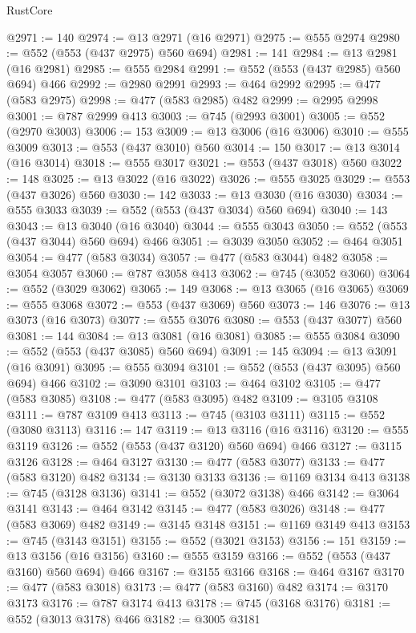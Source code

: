 \begin{lexlean}{RustCore}
\begin{coremodule}
@2971 := 140
@2974 := @13 @2971 (@16 @2971)
@2975 := @555 @2974
@2980 := @552 (@553 (@437 @2975) @560 @694)
@2981 := 141
@2984 := @13 @2981 (@16 @2981)
@2985 := @555 @2984
@2991 := @552 (@553 (@437 @2985) @560 @694) @466
@2992 := @2980 @2991
@2993 := @464 @2992
@2995 := @477 (@583 @2975)
@2998 := @477 (@583 @2985) @482
@2999 := @2995 @2998
@3001 := @787 @2999 @413
@3003 := @745 (@2993 @3001)
@3005 := @552 (@2970 @3003)
@3006 := 153
@3009 := @13 @3006 (@16 @3006)
@3010 := @555 @3009
@3013 := @553 (@437 @3010) @560
@3014 := 150
@3017 := @13 @3014 (@16 @3014)
@3018 := @555 @3017
@3021 := @553 (@437 @3018) @560
@3022 := 148
@3025 := @13 @3022 (@16 @3022)
@3026 := @555 @3025
@3029 := @553 (@437 @3026) @560
@3030 := 142
@3033 := @13 @3030 (@16 @3030)
@3034 := @555 @3033
@3039 := @552 (@553 (@437 @3034) @560 @694)
@3040 := 143
@3043 := @13 @3040 (@16 @3040)
@3044 := @555 @3043
@3050 := @552 (@553 (@437 @3044) @560 @694) @466
@3051 := @3039 @3050
@3052 := @464 @3051
@3054 := @477 (@583 @3034)
@3057 := @477 (@583 @3044) @482
@3058 := @3054 @3057
@3060 := @787 @3058 @413
@3062 := @745 (@3052 @3060)
@3064 := @552 (@3029 @3062)
@3065 := 149
@3068 := @13 @3065 (@16 @3065)
@3069 := @555 @3068
@3072 := @553 (@437 @3069) @560
@3073 := 146
@3076 := @13 @3073 (@16 @3073)
@3077 := @555 @3076
@3080 := @553 (@437 @3077) @560
@3081 := 144
@3084 := @13 @3081 (@16 @3081)
@3085 := @555 @3084
@3090 := @552 (@553 (@437 @3085) @560 @694)
@3091 := 145
@3094 := @13 @3091 (@16 @3091)
@3095 := @555 @3094
@3101 := @552 (@553 (@437 @3095) @560 @694) @466
@3102 := @3090 @3101
@3103 := @464 @3102
@3105 := @477 (@583 @3085)
@3108 := @477 (@583 @3095) @482
@3109 := @3105 @3108
@3111 := @787 @3109 @413
@3113 := @745 (@3103 @3111)
@3115 := @552 (@3080 @3113)
@3116 := 147
@3119 := @13 @3116 (@16 @3116)
@3120 := @555 @3119
@3126 := @552 (@553 (@437 @3120) @560 @694) @466
@3127 := @3115 @3126
@3128 := @464 @3127
@3130 := @477 (@583 @3077)
@3133 := @477 (@583 @3120) @482
@3134 := @3130 @3133
@3136 := @1169 @3134 @413
@3138 := @745 (@3128 @3136)
@3141 := @552 (@3072 @3138) @466
@3142 := @3064 @3141
@3143 := @464 @3142
@3145 := @477 (@583 @3026)
@3148 := @477 (@583 @3069) @482
@3149 := @3145 @3148
@3151 := @1169 @3149 @413
@3153 := @745 (@3143 @3151)
@3155 := @552 (@3021 @3153)
@3156 := 151
@3159 := @13 @3156 (@16 @3156)
@3160 := @555 @3159
@3166 := @552 (@553 (@437 @3160) @560 @694) @466
@3167 := @3155 @3166
@3168 := @464 @3167
@3170 := @477 (@583 @3018)
@3173 := @477 (@583 @3160) @482
@3174 := @3170 @3173
@3176 := @787 @3174 @413
@3178 := @745 (@3168 @3176)
@3181 := @552 (@3013 @3178) @466
@3182 := @3005 @3181

\end{coremodule}
\end{lexlean}
